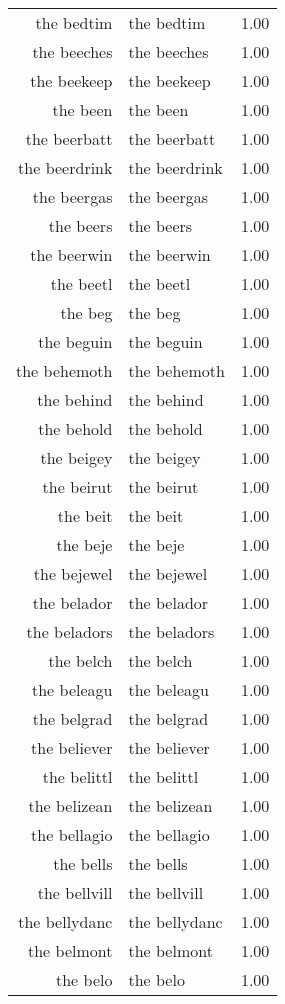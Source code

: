 \begin{table}[ht]
\begin{tabular}{rlr}
  the bedtim & the bedtim & 1.00 \\ 
  the beeches & the beeches & 1.00 \\ 
  the beekeep & the beekeep & 1.00 \\ 
  the been & the been & 1.00 \\ 
  the beerbatt & the beerbatt & 1.00 \\ 
  the beerdrink & the beerdrink & 1.00 \\ 
  the beergas & the beergas & 1.00 \\ 
  the beers & the beers & 1.00 \\ 
  the beerwin & the beerwin & 1.00 \\ 
  the beetl & the beetl & 1.00 \\ 
  the beg & the beg & 1.00 \\ 
  the beguin & the beguin & 1.00 \\ 
  the behemoth & the behemoth & 1.00 \\ 
  the behind & the behind & 1.00 \\ 
  the behold & the behold & 1.00 \\ 
  the beigey & the beigey & 1.00 \\ 
  the beirut & the beirut & 1.00 \\ 
  the beit & the beit & 1.00 \\ 
  the beje & the beje & 1.00 \\ 
  the bejewel & the bejewel & 1.00 \\ 
  the belador & the belador & 1.00 \\ 
  the beladors & the beladors & 1.00 \\ 
  the belch & the belch & 1.00 \\ 
  the beleagu & the beleagu & 1.00 \\ 
  the belgrad & the belgrad & 1.00 \\ 
  the believer & the believer & 1.00 \\ 
  the belittl & the belittl & 1.00 \\ 
  the belizean & the belizean & 1.00 \\ 
  the bellagio & the bellagio & 1.00 \\ 
  the bells & the bells & 1.00 \\ 
  the bellvill & the bellvill & 1.00 \\ 
  the bellydanc & the bellydanc & 1.00 \\ 
  the belmont & the belmont & 1.00 \\ 
  the belo & the belo & 1.00 \\ 

\end{tabular}
\end{table}
